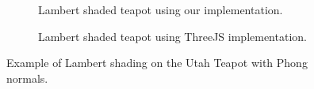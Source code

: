 \documentclass[10pt,twocolumn,letterpaper]{article}
\begin{document}
\begin{figure}
    \centering
    \begin{subfigure}{.48\linewidth}
        \caption{Lambert shaded teapot using our implementation.}
        \label{fig:our-lambert-tea}
    \end{subfigure}
    \hfill
    \begin{subfigure}{.48\linewidth}
        \caption{Lambert shaded teapot using ThreeJS implementation.}
        \label{fig:three-lambert-tea}
    \end{subfigure}
    \caption{Example of Lambert shading on the Utah Teapot with Phong normals.}
    \label{fig:lambert-tea}
\end{figure}
\end{document}

